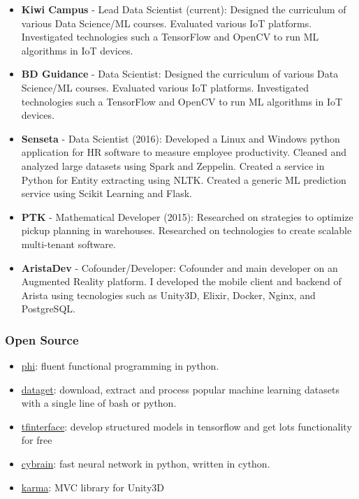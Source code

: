 \documentclass[]{article}
\begin{document}
\begin{itemize}
\itemsep1pt\parskip0pt
\item
  \textbf{Kiwi Campus} - Lead Data Scientist (current): Designed the
  curriculum of various Data Science/ML courses. Evaluated various IoT
  platforms. Investigated technologies such a TensorFlow and OpenCV to
  run ML algorithms in IoT devices.
\item
  \textbf{BD Guidance} - Data Scientist: Designed the curriculum of
  various Data Science/ML courses. Evaluated various IoT platforms.
  Investigated technologies such a TensorFlow and OpenCV to run ML
  algorithms in IoT devices.
\item
  \textbf{Senseta} - Data Scientist (2016): Developed a Linux and
  Windows python application for HR software to measure employee
  productivity. Cleaned and analyzed large datasets using Spark and
  Zeppelin. Created a service in Python for Entity extracting using
  NLTK. Created a generic ML prediction service using Scikit Learning
  and Flask.
\item
  \textbf{PTK} - Mathematical Developer (2015): Researched on strategies
  to optimize pickup planning in warehouses. Researched on technologies
  to create scalable multi-tenant software.
\item
  \textbf{AristaDev} - Cofounder/Developer: Cofounder and main developer
  on an Augmented Reality platform. I developed the mobile client and
  backend of Arista using tecnologies such as Unity3D, Elixir, Docker,
  Nginx, and PostgreSQL.
\end{itemize}

\subsubsection{Open Source}\label{open-source}

\begin{itemize}
\itemsep1pt\parskip0pt
\item
  \href{https://github.com/cgarciae/phi}{phi}: fluent functional
  programming in python.
\item
  \href{https://github.com/cgarciae/dataget}{dataget}: download, extract
  and process popular machine learning datasets with a single line of
  bash or python.
\item
  \href{https://github.com/cgarciae/tfinterface}{tfinterface}: develop
  structured models in tensorflow and get lots functionality for free
\item
  \href{https://github.com/cgarciae/cybrain}{cybrain}: fast neural
  network in python, written in cython.
\item
  \href{https://github.com/cgarciae/karma}{karma}: MVC library for
  Unity3D
\end{itemize}
\end{document}
